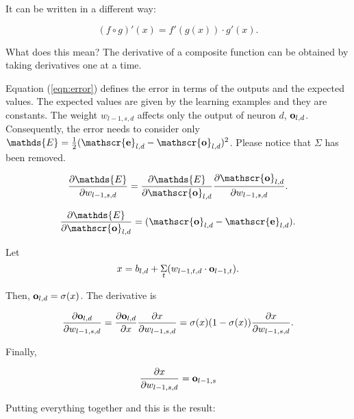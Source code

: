 It can be written in a different way:

\begin{equation}
(f \circ g)'(x) = f'(g(x)) \cdot g'(x).
\end{equation}

What does this mean?  The derivative of a composite function can be
obtained by taking derivatives one at a time.

Equation (\ref{eqn:error}) defines the error in terms of the outputs
and the expected values.  The expected values are given by the
learning examples and they are constants.  The weight $w_{l-1, s, d}$
affects only the output of neuron $d$, $\mathscr {\bf o}_{l, d}$.
Consequently, the error needs to consider only $\mathds{E}
= \frac{1}{2} (\mathscr {\bf e}_{l, d} - \mathscr {\bf o}_{l,
d})^2$. Please notice that $\Sigma$ has been removed.

\begin{equation}
\frac{\partial \mathds{E}}{\partial w_{l-1, s, d}}
= \frac{\partial \mathds{E}} {\partial \mathscr{\bf o}_{l, d}} \frac{\partial
\mathscr{\bf o}_{l, d}}{\partial w_{l-1, s, d}}.
\label{eqn:partialEoutput}
\end{equation}

\begin{equation}
\frac{\partial \mathds{E}} {\partial \mathscr{\bf o}_{l, d}}
= (\mathscr{\bf o}_{l, d} -   \mathscr{\bf e} _{l, d}).
\end{equation}

Let
\begin{equation}
x = b_{l, d} + \underset{t}{\Sigma} (w_{l-1, t, d}
\cdot \mathscr{\bf o}_{l- 1, t}).
\label{eqn:definex}
\end{equation}

Then,
$\mathscr{\bf o}_{l, d} = \sigma(x)$.
The derivative is

\begin{equation}
\frac{\partial
\mathscr{\bf o}_{l, d}}{\partial w_{l-1, s, d}}
= \frac{\partial \mathscr{\bf o}_{l, d}} {\partial x}
 \frac{\partial x} {\partial w_{l-1, s, d}}
= \sigma(x) (1 - \sigma(x)) \frac{\partial x} {\partial w_{l-1, s, d}}.
\end{equation}

Finally, 

\begin{equation}
\frac{\partial x} {\partial w_{l-1, s, d}} =  \mathscr{\bf o}_{l-1, s}
\label{eqn:partialxwl1}
\end{equation}

Putting everything together and this is the result:

